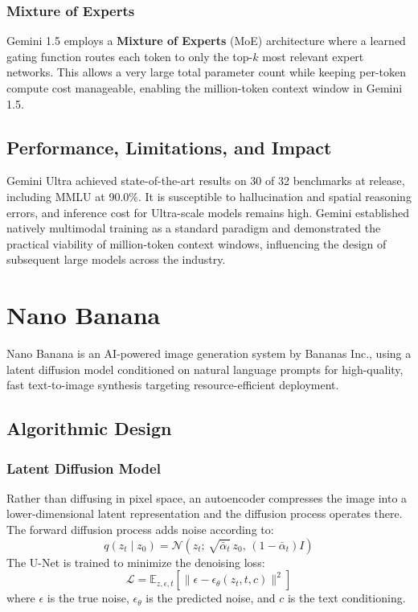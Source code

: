 \documentclass[12pt,a4paper]{report}
\begin{document}
\subsubsection{Mixture of Experts}
Gemini 1.5 employs a \textbf{Mixture of Experts} (MoE) architecture where a learned gating function routes each token to only the top-$k$ most relevant expert networks. This allows a very large total parameter count while keeping per-token compute cost manageable, enabling the million-token context window in Gemini 1.5.

\subsection{Performance, Limitations, and Impact}
Gemini Ultra achieved state-of-the-art results on 30 of 32 benchmarks at release, including MMLU at 90.0\%. It is susceptible to hallucination and spatial reasoning errors, and inference cost for Ultra-scale models remains high. Gemini established natively multimodal training as a standard paradigm and demonstrated the practical viability of million-token context windows, influencing the design of subsequent large models across the industry.

\section{Nano Banana}
Nano Banana is an AI-powered image generation system by Bananas Inc., using a latent diffusion model conditioned on natural language prompts for high-quality, fast text-to-image synthesis targeting resource-efficient deployment.

\subsection{Algorithmic Design}

\subsubsection{Latent Diffusion Model}
Rather than diffusing in pixel space, an autoencoder compresses the image into a lower-dimensional latent representation and the diffusion process operates there. The forward diffusion process adds noise according to:
\[
q(z_t \mid z_0) = \mathcal{N}(z_t;\, \sqrt{\bar{\alpha}_t}\, z_0,\, (1 - \bar{\alpha}_t)I)
\]
The U-Net is trained to minimize the denoising loss:
\[
\mathcal{L} = \mathbb{E}_{z, \epsilon, t}\!\left[\|\epsilon - \epsilon_\theta(z_t, t, c)\|^2\right]
\]
where $\epsilon$ is the true noise, $\epsilon_\theta$ is the predicted noise, and $c$ is the text conditioning.
\end{document}
